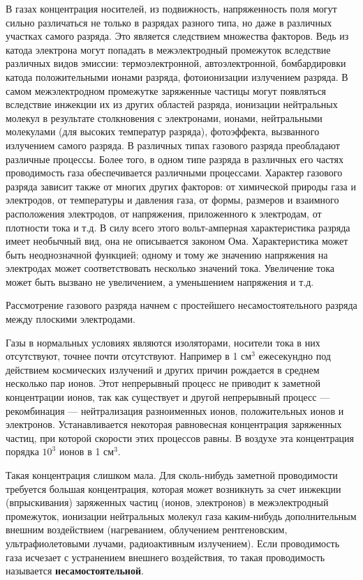 \documentclass[a4paper, 12pt]{article}
\begin{document}
В газах концентрация носителей, из подвижность, напряженность поля могут сильно различаться не только в разрядах разного типа, но даже в различных участках самого разряда. Это является следствием множества факторов. Ведь из катода электрона могут попадать в межэлектродный промежуток вследствие различных видов эмиссии: термоэлектронной, автоэлектронной, бомбардировки катода положительными ионами разряда, фотоионизации излучением разряда. В самом межэлектродном промежутке заряженные частицы могут появляться вследствие инжекции их из других областей разряда, ионизации нейтральных молекул в результате столкновения с электронами, ионами, нейтральными молекулами (для высоких температур разряда), фотоэффекта, вызванного излучением самого разряда. В различных типах газового разряда преобладают различные процессы. Более того, в одном типе разряда в различных его частях проводимость газа обеспечивается различными процессами. Характер газового разряда зависит также от многих других факторов: от химической природы газа и электродов, от температуры и давления газа, от формы, размеров и взаимного расположения электродов, от напряжения, приложенного к электродам, от плотности тока и т.д. В силу всего этого вольт-амперная характеристика разряда имеет необычный вид, она не описывается законом Ома. Характеристика может быть неоднозначной функцией; одному и тому же значению напряжения на электродах может соответствовать несколько значений тока. Увеличение тока может быть вызвано не увеличением, а уменьшением напряжения и т.д.\par
Рассмотрение газового разряда начнем с простейшего несамостоятельного разряда между плоскими электродами.\par
Газы в нормальных условиях являются изоляторами, носители тока в них отсутствуют, точнее почти отсутствуют. Например в 1 см$^3$ ежесекундно под действием космических излучений и других причин рождается в среднем несколько пар ионов. Этот непрерывный процесс не приводит к заметной концентрации ионов, так как существует и другой непрерывный процесс — рекомбинация — нейтрализация разноименных ионов, положительных ионов и электронов. Устанавливается некоторая равновесная концентрация заряженных частиц, при которой скорости этих процессов равны. В воздухе эта концентрация порядка $10^3$ ионов в 1 см$^3$.\par
Такая концентрация слишком мала. Для сколь-нибудь заметной проводимости требуется большая концентрация, которая может возникнуть за счет инжекции (впрыскивания) заряженных частиц (ионов, электронов) в межэлектродный промежуток, ионизации нейтральных молекул газа каким-нибудь дополнительным внешним воздействием (нагреванием, облучением рентгеновским, ультрафиолетовыми лучами, радиоактивным излучением). Если проводимость газа исчезает с устранением внешнего воздействия, то такая проводимость называется \textbf{несамостоятельной}.\par
\end{document}
